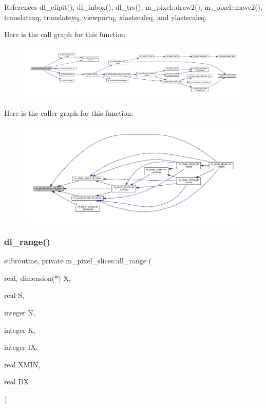 References dl\+\_\+clipit(), dl\+\_\+inbox(), dl\+\_\+trs(), m\+\_\+pixel\+::draw2(), m\+\_\+pixel\+::move2(), translatexq, translateyq, viewportq, xlastscaleq, and ylastscaleq.

Here is the call graph for this function\+:\nopagebreak
\begin{figure}[H]
\begin{center}
\leavevmode
\includegraphics[width=350pt]{namespacem__pixel__slices_aa70737b5f5945b2f513163ee5c40942d_cgraph}
\end{center}
\end{figure}
Here is the caller graph for this function\+:\nopagebreak
\begin{figure}[H]
\begin{center}
\leavevmode
\includegraphics[width=350pt]{namespacem__pixel__slices_aa70737b5f5945b2f513163ee5c40942d_icgraph}
\end{center}
\end{figure}
\mbox{\label{namespacem__pixel__slices_a47408b6c6411a3c3cb3419b319e57978}} 
\subsubsection{\texorpdfstring{dl\+\_\+range()}{dl\_range()}}
{\footnotesize\ttfamily subroutine, private m\+\_\+pixel\+\_\+slices\+::dl\+\_\+range (\begin{DoxyParamCaption}\item[{real, dimension($\ast$)}]{X,  }\item[{real}]{S,  }\item[{integer}]{N,  }\item[{integer}]{K,  }\item[{integer}]{IX,  }\item[{real}]{X\+M\+IN,  }\item[{real}]{DX }\end{DoxyParamCaption})\hspace{0.3cm}{\ttfamily [private]}}


